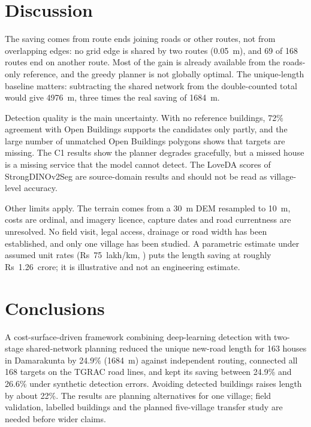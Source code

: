 \section{Discussion}
The saving comes from route ends joining roads or other routes, not from overlapping edges: no grid edge is shared by two routes (0.05~m), and 69 of 168 routes end on another route. Most of the gain is already available from the roads-only reference, and the greedy planner is not globally optimal. The unique-length baseline matters: subtracting the shared network from the double-counted total would give 4976~m, three times the real saving of 1684~m.

Detection quality is the main uncertainty. With no reference buildings, 72\% agreement with Open Buildings supports the candidates only partly, and the large number of unmatched Open Buildings polygons shows that targets are missing. The C1 results show the planner degrades gracefully, but a missed house is a missing service that the model cannot detect. The LoveDA scores of StrongDINOv2Seg are source-domain results and should not be read as village-level accuracy.

Other limits apply. The terrain comes from a 30~m DEM resampled to 10~m, costs are ordinal, and imagery licence, capture dates and road currentness are unresolved. No field visit, legal access, drainage or road width has been established, and only one village has been studied. A parametric estimate under assumed unit rates (Rs~75~lakh/km, ) puts the length saving at roughly Rs~1.26~crore; it is illustrative and not an engineering estimate.

\section{Conclusions}
A cost-surface-driven framework combining deep-learning detection with two-stage shared-network planning reduced the unique new-road length for 163 houses in Damarakunta by 24.9\% (1684~m) against independent routing, connected all 168 targets on the TGRAC road lines, and kept its saving between 24.9\% and 26.6\% under synthetic detection errors. Avoiding detected buildings raises length by about 22\%. The results are planning alternatives for one village; field validation, labelled buildings and the planned five-village transfer study are needed before wider claims.
